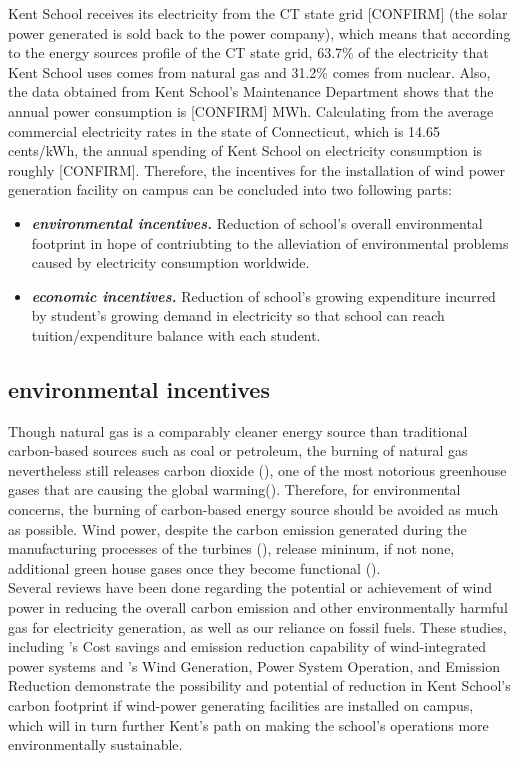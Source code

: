 \documentclass[review]{elsarticle}
\begin{document}
Kent School receives its electricity from the CT state grid [CONFIRM] (the solar power generated is sold back to the power company), which means that according to the 
energy sources profile of the CT state grid, 63.7\% of the electricity that Kent School uses comes from natural gas and 31.2\% comes from nuclear. Also, the data obtained 
from Kent School’s Maintenance Department shows that the annual power consumption is [CONFIRM] MWh. Calculating from the average commercial electricity rates in the state 
of Connecticut, which is 14.65 cents/kWh, the annual spending of Kent School on electricity consumption is roughly [CONFIRM]. Therefore, the incentives for the installation 
of wind power generation facility on campus can be concluded into two following parts:
\begin{itemize}
    \item \textit{\textbf{environmental incentives.}} Reduction of school's overall environmental footprint in hope of contriubting to the alleviation of environmental 
    problems caused by electricity consumption worldwide.
    \item \textit{\textbf{economic incentives.}} Reduction of school's growing expenditure incurred by student's growing demand in electricity so that school can reach 
    tuition/expenditure balance with each student.
\end{itemize}

\subsection{environmental incentives}
\label{sec:intro:environincentives}
Though natural gas is a comparably cleaner energy source than traditional carbon-based sources such as coal or petroleum, the burning of natural gas nevertheless still 
releases carbon dioxide (\cite{cost_and_performance_baseline_for_fossil_energy_plants}), one of the most notorious greenhouse gases that are causing the global 
warming(\cite{Shakun2012_co2_global_warming}). Therefore, for environmental concerns, the burning of carbon-based energy source should be avoided as much as possible. 
Wind power, despite the carbon emission generated during the manufacturing processes of the turbines (\cite{Kaldellis_carbon_foortprint_of_offshore_wind_energy}), release 
mininum, if not none, additional green house gases once they become functional (\cite{IEEE_wind_carbon_reduction}).
\\\indent Several reviews have been done regarding the potential or achievement of wind power in reducing the overall carbon emission and other environmentally harmful 
gas for electricity generation, as well as our reliance on fossil fuels. These studies, including \cite{rajat_cost_saving_and_emission_reduction}'s Cost savings and 
emission reduction capability of wind-integrated power systems and \cite{IEEE_wind_carbon_reduction}'s Wind Generation, Power System Operation, and Emission Reduction 
demonstrate the possibility and potential of reduction in Kent School’s carbon footprint if wind-power generating facilities are installed on campus, which will in turn 
further Kent’s path on making the school’s operations more environmentally sustainable.
 
\end{document}
